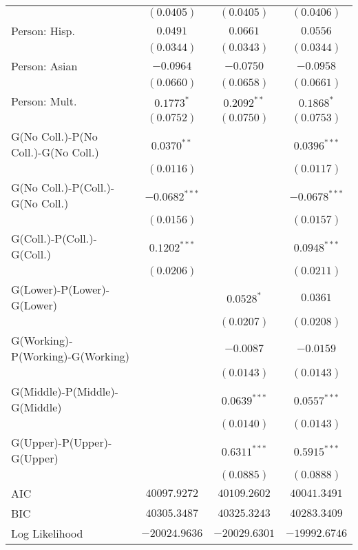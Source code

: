 \begin{center}
\begin{longtable}{l c c c}
                                    & $(0.0405)$      & $(0.0405)$     & $(0.0406)$      \\
Person: Hisp.                       & $0.0491$        & $0.0661$       & $0.0556$        \\
                                    & $(0.0344)$      & $(0.0343)$     & $(0.0344)$      \\
Person: Asian                       & $-0.0964$       & $-0.0750$      & $-0.0958$       \\
                                    & $(0.0660)$      & $(0.0658)$     & $(0.0661)$      \\
Person: Mult.                       & $0.1773^{*}$    & $0.2092^{**}$  & $0.1868^{*}$    \\
                                    & $(0.0752)$      & $(0.0750)$     & $(0.0753)$      \\
G(No Coll.)-P(No Coll.)-G(No Coll.) & $0.0370^{**}$   &                & $0.0396^{***}$  \\
                                    & $(0.0116)$      &                & $(0.0117)$      \\
G(No Coll.)-P(Coll.)-G(No Coll.)    & $-0.0682^{***}$ &                & $-0.0678^{***}$ \\
                                    & $(0.0156)$      &                & $(0.0157)$      \\
G(Coll.)-P(Coll.)-G(Coll.)          & $0.1202^{***}$  &                & $0.0948^{***}$  \\
                                    & $(0.0206)$      &                & $(0.0211)$      \\
G(Lower)-P(Lower)-G(Lower)          &                 & $0.0528^{*}$   & $0.0361$        \\
                                    &                 & $(0.0207)$     & $(0.0208)$      \\
G(Working)-P(Working)-G(Working)    &                 & $-0.0087$      & $-0.0159$       \\
                                    &                 & $(0.0143)$     & $(0.0143)$      \\
G(Middle)-P(Middle)-G(Middle)       &                 & $0.0639^{***}$ & $0.0557^{***}$  \\
                                    &                 & $(0.0140)$     & $(0.0143)$      \\
G(Upper)-P(Upper)-G(Upper)          &                 & $0.6311^{***}$ & $0.5915^{***}$  \\
                                    &                 & $(0.0885)$     & $(0.0888)$      \\
\midrule
AIC                                 & $40097.9272$    & $40109.2602$   & $40041.3491$    \\
BIC                                 & $40305.3487$    & $40325.3243$   & $40283.3409$    \\
Log Likelihood                      & $-20024.9636$   & $-20029.6301$  & $-19992.6746$   \\
\end{longtable}
\end{center}
